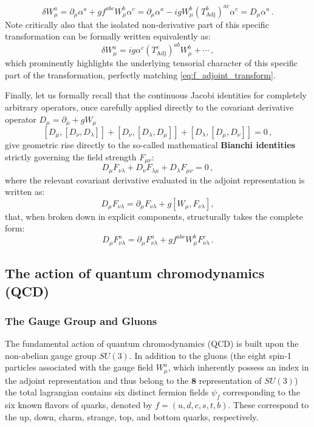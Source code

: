 \begin{equation} \label{eq:w_transform_adjoint}
    \delta W_\mu^a = \partial_\mu\alpha^a + g f^{abc}W_\mu^b \alpha^c = \partial_\mu\alpha^a - ig W_\mu^b (T_{\mathrm{Adj}}^b)^{ac}\alpha^c = D_\mu\alpha^a \, .
\end{equation}
Note critically also that the isolated non-derivative part of this specific transformation can be formally written equivalently as:
\begin{equation} \label{eq:w_nonderivative_transform}
    \delta W_\mu^a = ig\alpha^c(T_{\mathrm{Adj}}^c)^{ab}W_\mu^b + \cdots \, ,
\end{equation}
which prominently highlights the underlying tensorial character of this specific part of the transformation, perfectly matching \eqref{eq:f_adjoint_transform}.

Finally, let us formally recall that the continuous Jacobi identities for completely arbitrary operators, once carefully applied directly to the covariant derivative operator \(D_\mu = \partial_\mu + g W_\mu\)
\[
    [D_\mu, [D_\nu, D_\lambda]] + [D_\nu, [D_\lambda, D_\mu]] + [D_\lambda, [D_\mu, D_\nu]] = 0 \, ,
\]
give geometric rise directly to the so-called mathematical \textbf{Bianchi identities} strictly governing the field strength \(F_{\mu\nu}\):
\begin{equation} \label{eq:bianchi_identity}
    D_\mu F_{\nu\lambda} + D_\nu F_{\lambda\mu} + D_\lambda F_{\mu\nu} = 0 \, ,
\end{equation}
where the relevant covariant derivative evaluated in the adjoint representation is written as:
\[
    D_\mu F_{\nu\lambda} = \partial_\mu F_{\nu\lambda} + g[W_\mu, F_{\nu\lambda}],
\]
that, when broken down in explicit components, structurally takes the complete form:
\[
    D_\mu F_{\nu\lambda}^a = \partial_\mu F_{\nu\lambda}^a + g f^{abc} W_\mu^b F_{\nu\lambda}^c \, .
\]

\subsection{The action of quantum chromodynamics (QCD)}

\subsubsection{The Gauge Group and Gluons}

The fundamental action of quantum chromodynamics (QCD) is built upon the non-abelian gauge group \(SU(3)\). In addition to the gluons (the eight spin-1 particles associated with the gauge field \(W_\mu^a\), which inherently possess an index in the adjoint representation and thus belong to the \(\mathbf{8}\) representation of \(SU(3)\)) the total lagrangian contains six distinct fermion fields \(\psi_f\) corresponding to the six known flavors of quarks, denoted by \(f = (u, d, c, s, t, b)\). These correspond to the up, down, charm, strange, top, and bottom quarks, respectively.

